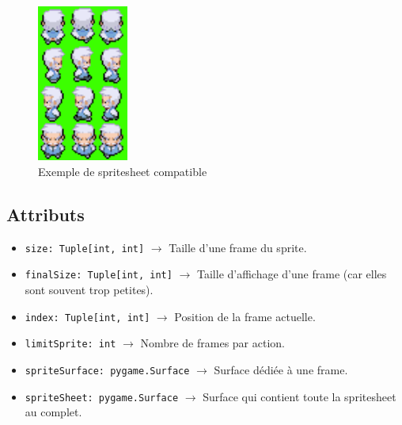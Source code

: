 \documentclass{report}
\begin{document}
\begin{figure}[hb!]
  \centering
  \includegraphics[width=3cm]{img/image3}
  \caption{Exemple de spritesheet compatible}
  \label{fig:spritesheet}
\end{figure}

\subsection*{Attributs}
\begin{itemize}
  \item \texttt{size: Tuple[int, int]}		$\rightarrow$ Taille d’une frame du sprite.
  \item \texttt{finalSize: Tuple[int, int]}		$\rightarrow$ Taille d'affichage d’une frame (car elles sont souvent trop petites).
  \item \texttt{index: Tuple[int, int]}		$\rightarrow$ Position de la frame actuelle.
  \item \texttt{limitSprite: int} $\rightarrow$ Nombre de frames par action.
  \item \texttt{spriteSurface: pygame.Surface}		$\rightarrow$ Surface dédiée à une frame.
  \item \texttt{spriteSheet: pygame.Surface}		$\rightarrow$ Surface qui contient toute la spritesheet au complet.
  \end{itemize}
\end{document}
